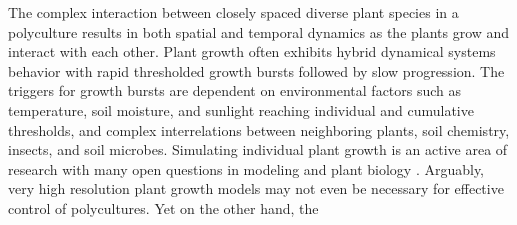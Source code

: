 
The complex interaction between closely spaced diverse plant species in a polyculture results in both spatial and temporal dynamics as the plants grow and interact with each other. %
Plant growth often exhibits hybrid dynamical systems behavior with rapid thresholded growth bursts followed by slow progression. The triggers for growth bursts are dependent on  environmental factors such as temperature, soil moisture, and sunlight reaching individual and cumulative thresholds, and complex interrelations between neighboring plants, soil chemistry, insects, and soil microbes. 
Simulating individual plant growth is an active area of research with many open questions in modeling and plant biology \cite{zhu2016plants}. Arguably, very high resolution plant growth models may not even be necessary for effective control of polycultures. Yet on the other hand, the  %
